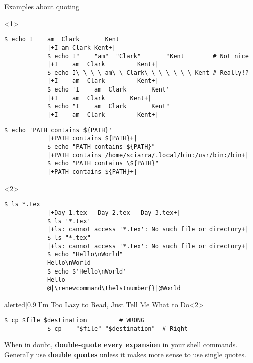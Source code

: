 \begin{frame}[fragile]{Examples about quoting}
    \begin{onlyenv}<1>
        \begin{lstlisting}[style=MyBash, style=oddnumbers]
            $ echo I    am  Clark       Kent
            |+I am Clark Kent+|
            $ echo I"    "am"  "Clark"       "Kent        # Not nice
            |+I    am  Clark         Kent+|
            $ echo I\ \ \ \ am\ \ Clark\ \ \ \ \ \ \ Kent # Really!?
            |+I    am  Clark         Kent+|
            $ echo 'I    am  Clark       Kent'
            |+I    am  Clark       Kent+|
            $ echo "I    am  Clark       Kent"
            |+I    am  Clark         Kent+|
        \end{lstlisting}
        \centerline{\tiny }
        \medskip
        \begin{lstlisting}[style=MyBash, style=oddnumbers]
            $ echo 'PATH contains ${PATH}'
            |+PATH contains ${PATH}+|
            $ echo "PATH contains ${PATH}"
            |+PATH contains /home/sciarra/.local/bin:/usr/bin:/bin+|
            $ echo "PATH contains \${PATH}"
            |+PATH contains ${PATH}+|
        \end{lstlisting}
    \end{onlyenv}
    \begin{onlyenv}<2>
        \renewcommand\thelstnumber{\ifnum\value{lstnumber}=11\relax\else\arabic{lstnumber}\fi}
        \begin{lstlisting}[style=MyBash, style=oddnumbers]
            $ ls *.tex
            |+Day_1.tex   Day_2.tex   Day_3.tex+|
            $ ls '*.tex'
            |+ls: cannot access '*.tex': No such file or directory+|
            $ ls "*.tex"
            |+ls: cannot access '*.tex': No such file or directory+|
            $ echo "Hello\nWorld"
            Hello\nWorld
            $ echo $'Hello\nWorld'
            Hello
            @|\renewcommand\thelstnumber{}|@World
        \end{lstlisting}
    \end{onlyenv}
    \begin{varblock}{alerted}[0.9\textwidth]{I'm Too Lazy to Read, Just Tell Me What to Do}<2>
        \begin{lstlisting}[style=MyBash, numbers=none, belowskip=-6mm,aboveskip=2mm]
            $ cp $file $destination         # WRONG
            $ cp -- "$file" "$destination"  # Right
        \end{lstlisting}
        When in doubt, \textbf{double-quote every expansion} in your shell commands.\\
        Generally use \textbf{double quotes} unless it makes more sense to use single quotes.
    \end{varblock}
\end{frame}
